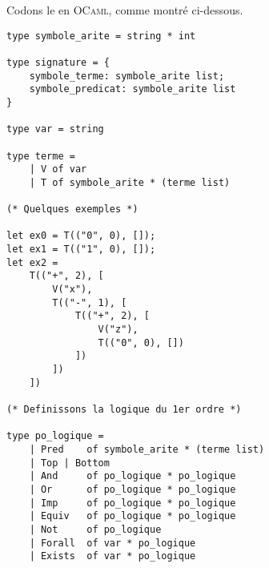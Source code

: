 Codons le en \textsc{OCaml}, comme montré ci-dessous.

\begin{lstlisting}[language=caml,caption=Définition des formules de premier ordre en \textsc{OCaml}]
type symbole_arite = string * int

type signature = {
	symbole_terme: symbole_arite list;
	symbole_predicat: symbole_arite list
}

type var = string

type terme =
	| V of var
	| T of symbole_arite * (terme list)

(* Quelques exemples *)

let ex0 = T(("0", 0), []);
let ex1 = T(("1", 0), []);
let ex2 =
	T(("+", 2), [
		V("x"),
		T(("-", 1), [
			T(("+", 2), [
				V("z"),
				T(("0", 0), [])
			])
		])
	])

(* Definissons la logique du 1er ordre *)

type po_logique =
	| Pred    of symbole_arite * (terme list)
	| Top | Bottom
	| And     of po_logique * po_logique
	| Or      of po_logique * po_logique
	| Imp     of po_logique * po_logique
	| Equiv   of po_logique * po_logique
	| Not     of po_logique
	| Forall  of var * po_logique
	| Exists  of var * po_logique
\end{lstlisting}
